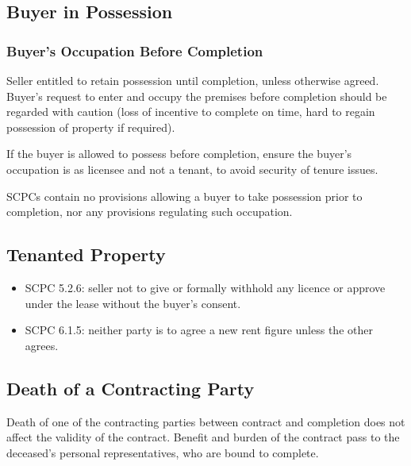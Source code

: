\documentclass[
]{article}
\providecommand{\tightlist}{%
  \setlength{\itemsep}{0pt}\setlength{\parskip}{0pt}}
\begin{document}
\hypertarget{buyer-in-possession}{%
\subsection{Buyer in Possession}\label{buyer-in-possession}}

\hypertarget{buyers-occupation-before-completion}{%
\subsubsection{Buyer's Occupation Before
Completion}\label{buyers-occupation-before-completion}}

Seller entitled to retain possession until completion, unless otherwise
agreed. Buyer's request to enter and occupy the premises before
completion should be regarded with caution (loss of incentive to
complete on time, hard to regain possession of property if required).

If the buyer is allowed to possess before completion, ensure the buyer's
occupation is as licensee and not a tenant, to avoid security of tenure
issues.

SCPCs contain no provisions allowing a buyer to take possession prior to
completion, nor any provisions regulating such occupation.

\hypertarget{tenanted-property}{%
\subsection{Tenanted Property}\label{tenanted-property}}

\begin{itemize}
\tightlist
\item
  SCPC 5.2.6: seller not to give or formally withhold any licence or
  approve under the lease without the buyer's consent.
\item
  SCPC 6.1.5: neither party is to agree a new rent figure unless the
  other agrees.
\end{itemize}

\hypertarget{death-of-a-contracting-party}{%
\subsection{Death of a Contracting
Party}\label{death-of-a-contracting-party}}

Death of one of the contracting parties between contract and completion
does not affect the validity of the contract. Benefit and burden of the
contract pass to the deceased's personal representatives, who are bound
to complete.
\end{document}
